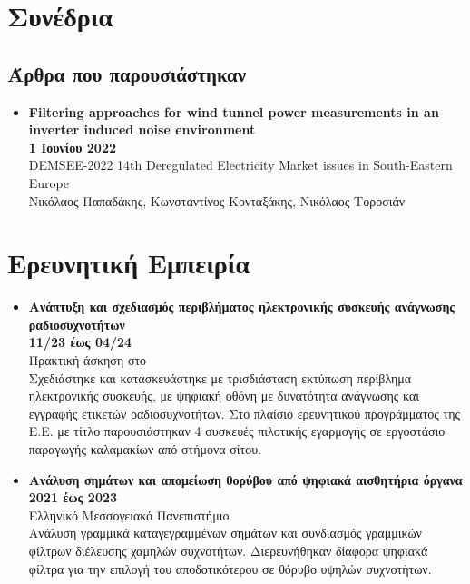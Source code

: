 \documentclass[a4paper,9pt]{extarticle}
\begin{document}

\section*{Συνέδρια}

\subsection*{Άρθρα που παρουσιάστηκαν}
\begin{itemize}
  \item{\textbf{Filtering approaches for wind tunnel power measurements in an inverter induced noise environment}} \\
        \textbf{1 Ιουνίου 2022} \\
        DEMSEE-2022 14th Deregulated Electricity Market issues in South-Eastern Europe \\
        Νικόλαος Παπαδάκης, Κωνσταντίνος Κονταξάκης, Νικόλαος Τοροσιάν
\end{itemize}


\section*{Ερευνητική Εμπειρία}
\begin{itemize}
\item{\textbf{Ανάπτυξη και σχεδιασμός περιβλήματος ηλεκτρονικής συσκευής ανάγνωσης ραδιοσυχνοτήτων}} \\
        \textbf{11/23 έως 04/24} \\
        Πρακτική άσκηση στο \\
        Σχεδιάστηκε και κατασκευάστηκε με τρισδιάσταση εκτύπωση περίβλημα
        ηλεκτρονικής συσκευής, με ψηφιακή οθόνη με δυνατότητα ανάγνωσης και
        εγγραφής ετικετών ραδιοσυχνοτήτων. Στο πλαίσιο ερευνητικού προγράμματος
        της Ε.Ε. με τίτλο 
        παρουσιάστηκαν 4 συσκευές πιλοτικής εγαρμογής σε εργοστάσιο παραγωγής
        καλαμακίων από στήμονα σίτου. \\
\item{\textbf{Ανάλυση σημάτων και απομείωση θορύβου από ψηφιακά αισθητήρια όργανα}}\\
        \textbf{2021 έως 2023} \\
        Ελληνικό Μεσσογειακό Πανεπιστήμιο \\
        Ανάλυση γραμμικά καταγεγραμμένων σημάτων και συνδιασμός γραμμικών
        φίλτρων διέλευσης χαμηλών συχνοτήτων. Διερευνήθηκαν δίαφορα ψηφιακά φίλτρα
        για την επιλογή του αποδοτικότερου σε θόρυβο υψηλών συχνοτήτων. \\
\end{itemize}
\end{document}
